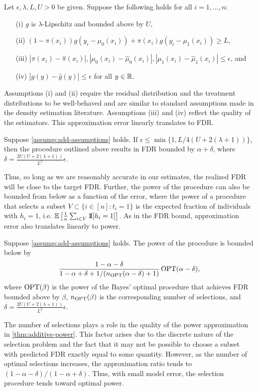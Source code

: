 \begin{assumption}
\label{assump:add-assumptions}
Let $\epsilon, \lambda, L, U > 0$ be given. Suppose the following holds for all $i=1,\ldots, n$:
\begin{itemize}
    \item[(i)] $g$ is $\lambda$-Lipschitz and bounded above by $U$,
    \item[(ii)] $(1-\pi(x_i))g(y_i - \mu_0(x_i)) + \pi(x_i) g(y_i - \mu_1(x_i)) \geq L$,
    \item [(iii)] $|\pi(x_i) - \hat{\pi}(x_i)|, |\mu_0(x_i) - \hat{\mu}_0(x_i)|, |\mu_1(x_i) - \hat{\mu}_1(x_i)| \leq \epsilon$, and
    \item[(iv)] $|g(y) - \hat{g}(y)| \leq \epsilon$ for all $y \in \mathbb{R}$.
\end{itemize}
\end{assumption}
Assumptions (i) and (ii) require the residual distribution and the treatment distributions to be well-behaved and are similar to standard assumptions made in the density estimation literature. Assumptions (iii) and (iv) reflect the quality of the estimators. This approximation error linearly translates to FDR.
\begin{theorem}
\label{thm:additive-fdr}
Suppose \cref{assump:add-assumptions} holds. If $\epsilon \leq \min \{1, L/4(U+2(\lambda + 1)) \}$, then the procedure outlined above results in FDR bounded by $\alpha + \delta$, where $\delta = \frac{2U(U+2(\lambda + 1))}{L^2} \epsilon$.
\end{theorem}
Thus, so long as we are reasonably accurate in our estimates, the realized FDR will be close to the target FDR.
Further, the power of the procedure can also be bounded from below as a function of the error, where the power of a procedure that selects a subset $V \subset \{ i \in [n]: t_i=1 \}$ is the expected fraction of individuals with $h_i = 1$, i.e. $\mathbb{E}\left[ \frac{1}{n} \sum_{i \in V} \operatorname*{1{\hskip -2.5 pt}\hbox{I}}[h_i = 1] \right]$. As in the FDR bound, approximation error also translates linearly to power.
\begin{theorem}
\label{thm:additive-power}
Suppose \cref{assump:add-assumptions} holds. The power of the procedure is bounded below by 
\[ \frac{1-\alpha - \delta}{1-\alpha + \delta + 1/(n_{\operatorname{OPT}}(\alpha - \delta) +1)} \operatorname{OPT}(\alpha - \delta), \]
where $\operatorname{OPT}(\beta)$ is the power of the Bayes' optimal procedure that achieves FDR bounded above by $\beta$, $n_{\operatorname{OPT}}(\beta)$ is the corresponding number of selections, and $\delta = \frac{2U(U+2(\lambda + 1))}{L^2} \epsilon$.
\end{theorem}
The number of selections plays a role in the quality of the power approximation in \cref{thm:additive-power}. This factor arises due to the discrete nature of the selection problem and the fact that it may not be possible to choose a subset with predicted FDR exactly equal to some quantity. However, as the number of optimal selections increases, the approximation ratio tends to $(1-\alpha-\delta)/(1-\alpha + \delta)$. Thus, with small model error, the selection procedure tends toward optimal power.
